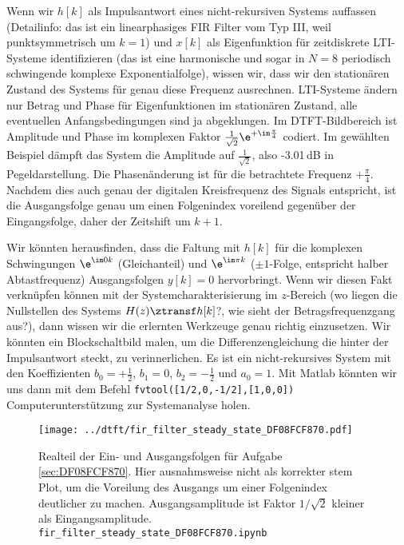 \begin{Loesung}
Wenn wir $h[k]$ als Impulsantwort eines nicht-rekursiven Systems auffassen
(Detailinfo: das ist ein linearphasiges FIR Filter vom Typ III, weil punktsymmetrisch um $k=1$)
und $x[k]$ als Eigenfunktion für zeitdiskrete LTI-Systeme identifizieren
(das ist eine harmonische und sogar in $N=8$ periodisch schwingende komplexe
Exponentialfolge), wissen wir, dass wir den stationären Zustand des Systems
für genau diese Frequenz ausrechnen.
%
LTI-Systeme ändern nur Betrag und Phase für Eigenfunktionen im stationären Zustand,
alle eventuellen Anfangsbedingungen sind ja abgeklungen.
%
Im DTFT-Bildbereich ist Amplitude und Phase im komplexen Faktor
$\frac{1}{\sqrt{2}} \e^{+\im\frac{\pi}{4}}$
codiert.
%
Im gewählten Beispiel dämpft das System die Amplitude auf $\frac{1}{\sqrt{2}}$,
also -3.01\,dB in Pegeldarstellung.
%
Die Phasenänderung ist für die betrachtete Frequenz $+\frac{\pi}{4}$.
Nachdem dies auch genau der digitalen Kreisfrequenz des Signals entspricht,
ist die Ausgangsfolge
genau um einen Folgenindex voreilend gegenüber der Eingangsfolge, daher der
Zeitshift um $k+1$.
%

Wir könnten herausfinden, dass die Faltung mit $h[k]$ für die komplexen
Schwingungen $\e^{\im 0 k}$ (Gleichanteil) und $\e^{\im \pi k}$ ($\pm 1$-Folge,
entspricht halber Abtastfrequenz) Ausgangsfolgen $y[k]=0$ hervorbringt.
%
Wenn wir diesen Fakt verknüpfen können mit der Systemcharakterisierung
im $z$-Bereich (wo liegen die Nullstellen des Systems $H(z) \ztransf h[k]$?,
wie sieht der Betragsfrequenzgang aus?),
dann wissen wir die erlernten Werkzeuge genau richtig einzusetzen.
%
Wir könnten ein Blockschaltbild malen, um die Differenzengleichung die hinter
der Impulsantwort steckt, zu verinnerlichen.
%
Es ist ein nicht-rekursives System mit den Koeffizienten $b_0=+\frac{1}{2}$, $b_1=0$,
$b_2=-\frac{1}{2}$ und $a_0=1$.
%
Mit Matlab könnten wir uns dann mit dem Befehl \texttt{fvtool([1/2,0,-1/2],[1,0,0])}
Computerunterstützung zur Systemanalyse holen.
\end{Loesung}

\begin{figure}
\centering
\texttt{[image: ../dtft/fir\_filter\_steady\_state\_DF08FCF870.pdf]}
\caption{Realteil der Ein- und Ausgangsfolgen für Aufgabe \ref{sec:DF08FCF870}.
Hier ausnahmsweise nicht als korrekter stem Plot, um die Voreilung des Ausgangs
um einer Folgenindex deutlicher zu machen. Ausgangsamplitude ist Faktor
$1/\sqrt{2}$ kleiner als Eingangsamplitude.
\texttt{fir\_filter\_steady\_state\_DF08FCF870.ipynb}}
\label{fig:DF08FCF870}
\end{figure}



